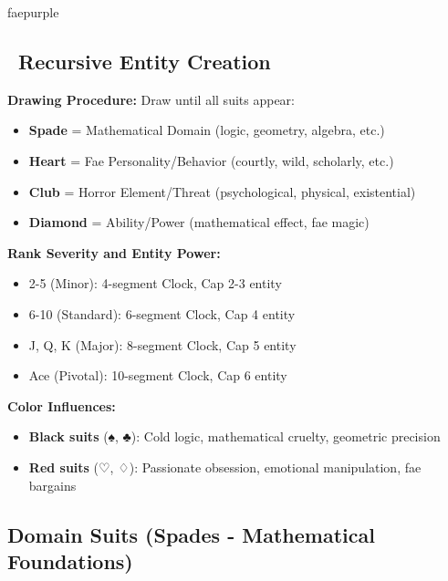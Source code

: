\documentclass[11pt]{article}
\begin{document}
\newpage

\begin{campaignsection}{faepurple}
\subsection*{\faRandom\ Recursive Entity Creation}

\textbf{Drawing Procedure:} Draw until all suits appear:
\begin{itemize}
    \item \textbf{Spade} = Mathematical Domain (logic, geometry, algebra, etc.)
    \item \textbf{Heart} = Fae Personality/Behavior (courtly, wild, scholarly, etc.)
    \item \textbf{Club} = Horror Element/Threat (psychological, physical, existential)
    \item \textbf{Diamond} = Ability/Power (mathematical effect, fae magic)
\end{itemize}

\textbf{Rank Severity and Entity Power:}
\begin{itemize}
    \item 2-5 (Minor): 4-segment Clock, Cap 2-3 entity
    \item 6-10 (Standard): 6-segment Clock, Cap 4 entity
    \item J, Q, K (Major): 8-segment Clock, Cap 5 entity
    \item Ace (Pivotal): 10-segment Clock, Cap 6 entity
\end{itemize}

\textbf{Color Influences:}
\begin{itemize}
    \item \textbf{Black suits} (♠, ♣): Cold logic, mathematical cruelty, geometric precision
    \item \textbf{Red suits} (♡, ♢): Passionate obsession, emotional manipulation, fae bargains
\end{itemize}

\subsection*{Domain Suits (Spades - Mathematical Foundations)}


\end{campaignsection}
\end{document}

